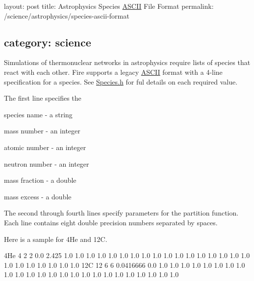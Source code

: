 

 layout\+: post title\+: Astrophysics Species \hyperlink{a02172}{A\+S\+C\+II} File Format permalink\+: /science/astrophysics/species-\/ascii-\/format \subsection*{category\+: science }

Simulations of thermonuclear networks in astrophysics require lists of species that react with each other. Fire supports a legacy \hyperlink{a02172}{A\+S\+C\+II} format with a 4-\/line specification for a species. See \hyperlink{a00290_source}{Species.\+h} for ful details on each required value.

The first line specifies the


\begin{DoxyItemize}
\item species name -\/ a string
\item mass number -\/ an integer
\item atomic number -\/ an integer
\item neutron number -\/ an integer
\item mass fraction -\/ a double
\item mass excess -\/ a double
\end{DoxyItemize}

The second through fourth lines specify parameters for the partition function. Each line contains eight double precision numbers separated by spaces.

Here is a sample for 4\+He and 12C.


\begin{DoxyCode}
4He 4 2 2 0.0 2.425
1.0 1.0 1.0 1.0 1.0 1.0 1.0 1.0
1.0 1.0 1.0 1.0 1.0 1.0 1.0 1.0
1.0 1.0 1.0 1.0 1.0 1.0 1.0 1.0
12C 12 6 6 0.0416666 0.0
1.0 1.0 1.0 1.0 1.0 1.0 1.0 1.0
1.0 1.0 1.0 1.0 1.0 1.0 1.0 1.0
1.0 1.0 1.0 1.0 1.0 1.0 1.0 1.0
\end{DoxyCode}
 